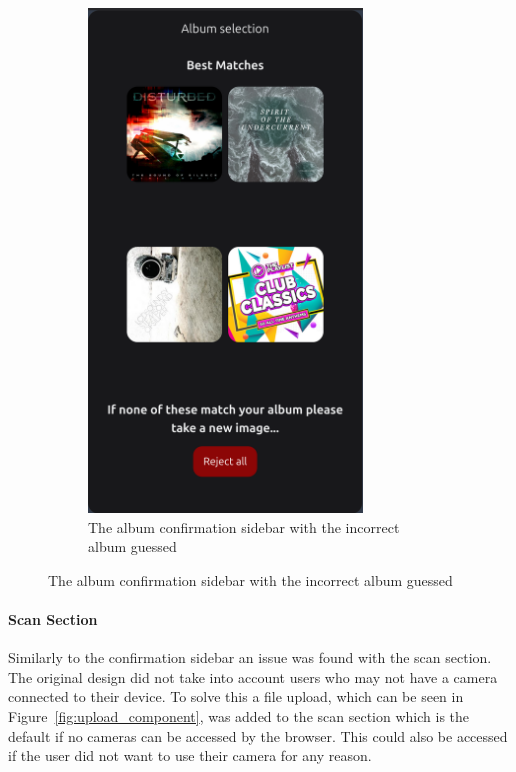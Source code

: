 \begin{figure}[H]
\begin{subfigure}[t]{0.3\textwidth}
        \includegraphics[width=0.8\textwidth]{figures/top_results_confirm.png}
        \caption{The album confirmation sidebar with the incorrect album guessed}
        \label{fig:album_confirmation_sidebar_incorrect}
    \end{subfigure}
\end{figure}

\paragraph{Scan Section}
Similarly to the confirmation sidebar an issue was found with the scan section. The original design did not take into account users who may not have a camera connected to their device. To solve this a file upload, which can be seen in Figure~\ref{fig:upload_component}, was added to the scan section which is the default if no cameras can be accessed by the browser. This could also be accessed if the user did not want to use their camera for any reason.

